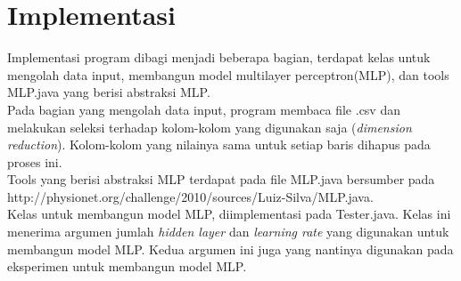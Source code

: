 \section{Implementasi}
Implementasi program dibagi menjadi beberapa bagian, terdapat kelas untuk mengolah data input, membangun model multilayer perceptron(MLP), dan tools MLP.java yang berisi abstraksi MLP.\\
Pada bagian yang mengolah data input, program membaca file .csv dan melakukan seleksi terhadap kolom-kolom yang digunakan saja (\textit{dimension reduction}). Kolom-kolom yang nilainya sama untuk setiap baris dihapus pada proses ini.\\
Tools yang berisi abstraksi MLP terdapat pada file MLP.java bersumber pada http://physionet.org/challenge/2010/sources/Luiz-Silva/MLP.java.\\
Kelas untuk membangun model MLP, diimplementasi pada Tester.java. Kelas ini menerima argumen jumlah \textit{hidden layer} dan \textit{learning rate} yang digunakan untuk membangun model MLP. Kedua argumen ini juga yang nantinya digunakan pada eksperimen untuk membangun model MLP.
\lipsum